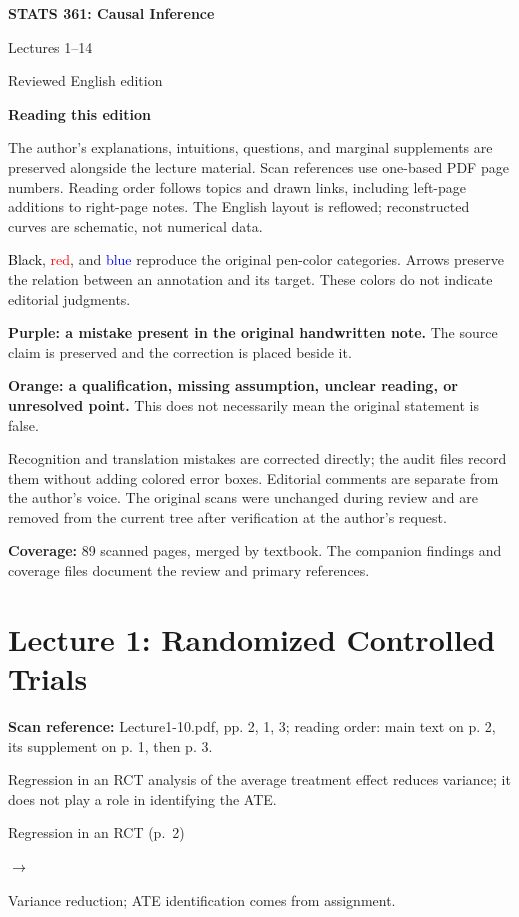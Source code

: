 \documentclass[11pt,a4paper]{article}
\newcommand{\sourcepages}[1]{\par{\small\sffamily\color{muted}\textbf{Scan reference:} #1\par}\nobreak\smallskip\nopagebreak[4]}
\newcommand{\inkblue}[1]{\textcolor{blue}{#1}}
\newcommand{\inkred}[1]{\textcolor{red}{#1}}
\newcommand{\notearrow}[3]{%
\par\Needspace{6\baselineskip}\smallskip
\noindent\begin{minipage}[c]{0.43\linewidth}\raggedright\color{#1}#2\end{minipage}%
\hfill\textcolor{#1}{\(\longrightarrow\)}\hfill%
\begin{minipage}[c]{0.43\linewidth}\raggedright#3\end{minipage}\par\smallskip}
\begin{document}
\begin{titlepage}\thispagestyle{empty}
\vspace*{14mm}{\small\sffamily MING'S PERSONAL STUDY NOTES\par}\vspace{10mm}
{\Huge\sffamily\bfseries STATS 361: Causal Inference\par}\vspace{8mm}
{\LARGE\sffamily Lectures 1--14\par}\vspace{10mm}
{\large Reviewed English edition\par}\vfill
\textbf{Reading this edition}\par
The author's explanations, intuitions, questions, and marginal supplements are preserved alongside the lecture material. Scan references use one-based PDF page numbers. Reading order follows topics and drawn links, including left-page additions to right-page notes. The English layout is reflowed; reconstructed curves are schematic, not numerical data.\par
\textcolor{black}{Black}, \inkred{red}, and \inkblue{blue} reproduce the original pen-color categories. Arrows preserve the relation between an annotation and its target. These colors do not indicate editorial judgments.\par
\textcolor{ReviewPurple}{\textbf{Purple: a mistake present in the original handwritten note.}} The source claim is preserved and the correction is placed beside it.\par
\textcolor{ReviewOrange}{\textbf{Orange: a qualification, missing assumption, unclear reading, or unresolved point.}} This does not necessarily mean the original statement is false.\par
Recognition and translation mistakes are corrected directly; the audit files record them without adding colored error boxes. Editorial comments are separate from the author's voice. The original scans were unchanged during review and are removed from the current tree after verification at the author's request.\par
\textbf{Coverage:} 89 scanned pages, merged by textbook. The companion findings and coverage files document the review and primary references.\par
\vspace{6mm}{\small Prepared 31 October 2026\par}
\end{titlepage}\tableofcontents\clearpage
{}
\section{Lecture 1: Randomized Controlled Trials}
\sourcepages{Lecture1-10.pdf, pp. 2, 1, 3; reading order: main text on p. 2, its supplement on p. 1, then p. 3.}
Regression in an RCT analysis of the average treatment effect reduces variance; it does not play a role in identifying the ATE.
\notearrow{black}{Regression in an RCT (p.~2)}{Variance reduction; ATE identification comes from assignment.}
\end{document}
